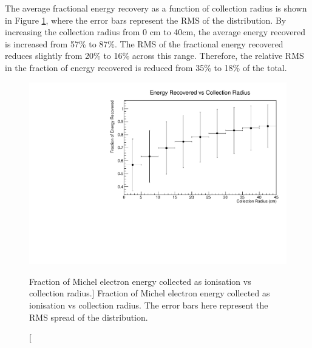 The average fractional energy recovery as a function of collection radius is
shown in Figure \ref{fig:frac_v_radius}, where the error bars represent the RMS
of the distribution. By increasing the collection radius from 0 cm to 40cm,
the average energy recovered is increased from 57\% to 87\%. The RMS of the
fractional energy recovered reduces slightly from 20\% to 16\% across this
range. Therefore, the relative RMS in the fraction of energy recovered is
reduced from 35\% to 18\% of the total.
\begin{figure}
	\centering
	\includegraphics[width=\textwidth]{figures/energy_recovery_v_radius.pdf}
	\caption
	[Fraction of Michel electron energy collected as ionisation vs collection
	radius.]
	{Fraction of Michel electron energy collected as ionisation vs collection
	radius. The error bars here represent the RMS spread of the distribution. }
	\label{fig:frac_v_radius}
\end{figure}

